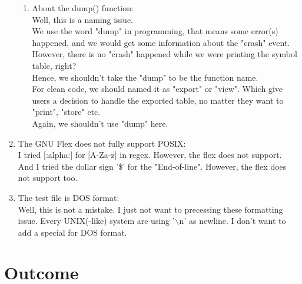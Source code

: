\documentclass[12pt,a4paper]{article}
\begin{document}
\begin{CJK}{UTF8}{bsmi}
\begin{enumerate}
\begin{enumerate}
                  \item About the dump() function:\\
                        Well, this is a naming issue.\\
                        We use the word "dump" in programming, that means some error(s)
                        happened, and we would get some information about the "crash" event.
                        However, there is no "crash" happened while we were printing the
                        symbol table, right?\\
                        Hence, we shouldn't take the "dump" to be the function name.\\
                        For clean code, we should named it as "export" or "view". Which
                        give users a decision to handle the exported table, no matter they
                        want to "print", "store" etc.\\
                        Again, we shouldn't use "dump" here.
              \end{enumerate}

        \item The GNU Flex does not fully support POSIX:\\
              I tried $[$:alpha:$]$ for $[$A-Za-z$]$ in regex. However, the flex does
              not support.\\
              And I tried the dollar sign '\$' for the "End-of-line". However, the flex
              does not support too.

        \item The test file is DOS format:\\
              Well, this is not a mistake. I just not want to precessing these formatting issue.
              Every UNIX(-like) system are using '$\backslash$n' as newline. I don't want
              to add a special for DOS format.
    \end{enumerate}

    \section{Outcome}
    

\end{CJK}
\end{document}
